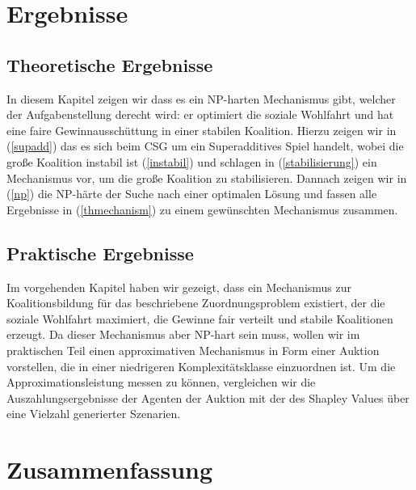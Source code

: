 \documentclass[sigconf]{acmart}
\theoremstyle{break}
\begin{document}



\section{Ergebnisse}
\label{ergebnisse}
\subsection{Theoretische Ergebnisse}
In diesem Kapitel zeigen wir dass es ein NP-harten Mechanismus gibt, welcher der Aufgabenstellung derecht wird: er optimiert die soziale Wohlfahrt und hat eine faire Gewinnausschüttung in einer stabilen Koalition. Hierzu zeigen wir in (\ref{supadd}) das es sich beim CSG um ein Superadditives Spiel handelt, wobei die große Koalition instabil ist (\ref{instabil}) und schlagen in (\ref{stabilisierung}) ein Mechanismus vor, um die große Koalition zu stabilisieren. Dannach zeigen wir in (\ref{np}) die NP-härte der Suche nach einer optimalen Lösung und fassen alle Ergebnisse in (\ref{thmechanism}) zu einem gewünschten Mechanismus zusammen.



\subsection{Praktische Ergebnisse}
Im vorgehenden Kapitel haben wir gezeigt, dass ein Mechanismus zur Koalitionsbildung für das beschriebene Zuordnungsproblem existiert, der die soziale Wohlfahrt maximiert, die Gewinne fair verteilt und stabile Koalitionen erzeugt. Da dieser Mechanismus aber NP-hart sein muss, wollen wir im praktischen Teil einen approximativen Mechanismus in Form einer Auktion vorstellen, die in einer niedrigeren Komplexitätsklasse einzuordnen ist. Um die Approximationsleistung messen zu können, vergleichen wir die Auszahlungsergebnisse der Agenten der Auktion mit der des Shapley Values über eine Vielzahl generierter Szenarien.


\section{Zusammenfassung}



\end{document}
